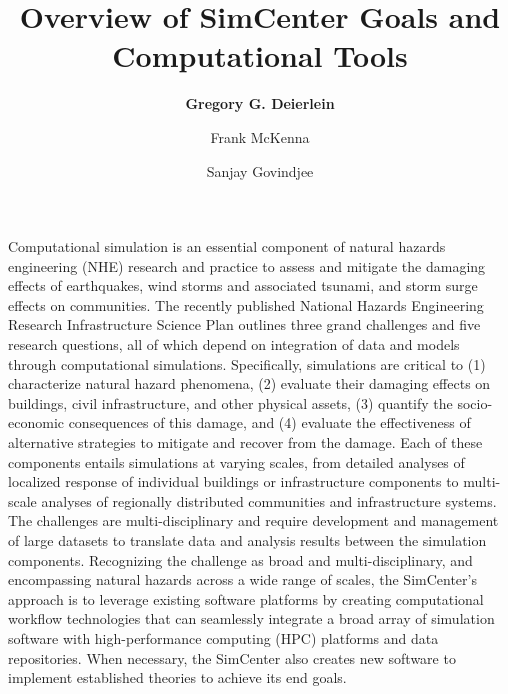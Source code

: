 %
%
%

\title{Overview of SimCenter Goals and Computational Tools}
\author{
    \textbf{Gregory G. Deierlein}
    \and Frank McKenna
    \and Sanjay Govindjee}
\tocauthor{}
%
%
\maketitle
\label{chapter:intro}

Computational simulation is an essential component of natural hazards engineering (NHE) research and practice to assess and mitigate the damaging effects of earthquakes, wind storms and associated tsunami, and storm surge effects on communities. The recently published National Hazards Engineering Research Infrastructure Science Plan \citep{edge2020natural} outlines three grand challenges and five research questions, all of which depend on integration of data and models through computational simulations.  Specifically, simulations are critical to (1) characterize natural hazard phenomena, (2) evaluate their damaging effects on buildings, civil infrastructure, and other physical assets, (3) quantify the socio-economic consequences of this damage, and (4) evaluate the effectiveness of alternative strategies to mitigate and recover from the damage.  Each of these components entails simulations at varying scales, from detailed analyses of localized response of individual buildings or infrastructure components to multi-scale analyses of regionally distributed communities and infrastructure systems.  The challenges are multi-disciplinary and require development and management of large datasets to translate data and analysis results between the simulation components. Recognizing the challenge as broad and multi-disciplinary, and encompassing natural hazards across a wide range of scales, the SimCenter’s approach is to leverage existing software platforms by creating computational workflow technologies that can seamlessly integrate a broad array of simulation software with high-performance computing (HPC) platforms and data repositories. When necessary, the SimCenter also creates new software to implement established theories to achieve its end goals.

